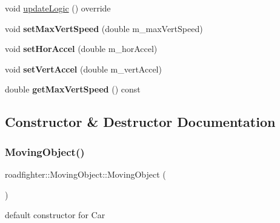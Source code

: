 \begin{DoxyCompactItemize}
\item 
void \hyperlink{classroadfighter_1_1MovingObject_a2c5d69054a59fc5c6d7458f864ee9d57}{update\+Logic} () override
\item 
\mbox{\label{classroadfighter_1_1MovingObject_a193dbc310915e3f81071170b3250516e}} 
void {\bfseries set\+Max\+Vert\+Speed} (double m\+\_\+max\+Vert\+Speed)
\item 
\mbox{\label{classroadfighter_1_1MovingObject_a47bcc94c24b3b6b047ecf45c22574d09}} 
void {\bfseries set\+Hor\+Accel} (double m\+\_\+hor\+Accel)
\item 
\mbox{\label{classroadfighter_1_1MovingObject_a52313182d28796bf27762047c8b289fd}} 
void {\bfseries set\+Vert\+Accel} (double m\+\_\+vert\+Accel)
\item 
\mbox{\label{classroadfighter_1_1MovingObject_a5291cd441cc9b4f4650ff14c584f28d2}} 
double {\bfseries get\+Max\+Vert\+Speed} () const
\end{DoxyCompactItemize}


\subsection{Constructor \& Destructor Documentation}
\mbox{\label{classroadfighter_1_1MovingObject_acd1afb2c2845299fc2b6a7e729368ba9}} 
\subsubsection{\texorpdfstring{Moving\+Object()}{MovingObject()}\hspace{0.1cm}{\footnotesize\ttfamily [1/3]}}
{\footnotesize\ttfamily roadfighter\+::\+Moving\+Object\+::\+Moving\+Object (\begin{DoxyParamCaption}{ }\end{DoxyParamCaption})\hspace{0.3cm}{\ttfamily [default]}}

default constructor for Car \mbox{\label{classroadfighter_1_1MovingObject_ae9c48dc389d0a594ea7bd108849e467f}} 
